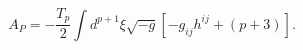 \begin{equation}
A_{P}=-\frac{T_p}{2}\int d^{p+1}{\xi}\sqrt{-g}\left[-g_{ij}h^{ij}+(p+3)\right].
\label{np2}
\end{equation}

